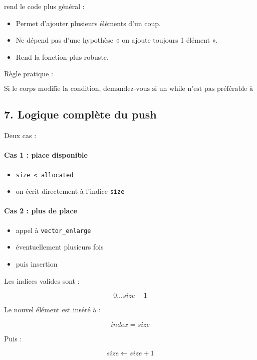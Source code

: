 rend le code plus général :

\begin{itemize}
    \item Permet d’ajouter plusieurs éléments d’un coup.
    \item Ne dépend pas d’une hypothèse « on ajoute toujours 1 élément ».
    \item Rend la fonction plus robuste.
\end{itemize}

Règle pratique :

\[
\boxed{\text{Si le corps modifie la condition, demandez-vous si un while n’est pas préférable à un if}}
\]

\subsection{7. Logique complète du push}

Deux cas :

\paragraph{Cas 1 : place disponible}

\begin{itemize}
    \item \texttt{size < allocated}
    \item on écrit directement à l’indice \texttt{size}
\end{itemize}

\paragraph{Cas 2 : plus de place}

\begin{itemize}
    \item appel à \texttt{vector\_enlarge}
    \item éventuellement plusieurs fois
    \item puis insertion
\end{itemize}

Les indices valides sont :

\[
0 \dots size - 1
\]

Le nouvel élément est inséré à :

\[
index = size
\]

Puis :

\[
size \leftarrow size + 1
\]

